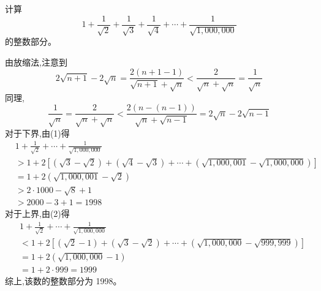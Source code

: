\begin{questions}
    \question 计算 
    \[
    1 + \frac{1}{\sqrt{2}} + \frac{1}{\sqrt{3}} + \frac{1}{\sqrt{4}} + \cdots + \frac{1}{\sqrt{1,000,000}}
    \]
    的整数部分。
    \begin{solution}
        由放缩法,注意到
        \[ 
        2\sqrt{n+1} - 2\sqrt{n} = \frac{2(n+1-1)}{\sqrt{n+1} + \sqrt{n}} < \frac{2}{\sqrt{n} + \sqrt{n}} = \frac{1}{\sqrt{n}} \tag{1}
        \]
        同理,
        \[
        \frac{1}{\sqrt{n}} = \frac{2}{\sqrt{n} + \sqrt{n}} < \frac{2(n-(n-1))}{\sqrt{n} + \sqrt{n-1}} = 2\sqrt{n} - 2\sqrt{n-1} \tag{2}
        \]
        对于下界,由(1)得
        \begin{align*}
        &1 + \frac{1}{\sqrt{2}} + \cdots + \frac{1}{\sqrt{1,000,000}} \\
        &> 1 + 2 \left[(\sqrt{3} - \sqrt{2}) + (\sqrt{4} - \sqrt{3}) + \cdots + (\sqrt{1,000,001} - \sqrt{1,000,000})\right] \\
        &= 1 + 2(\sqrt{1,000,001} - \sqrt{2}) \\
        &> 2 \cdot 1000 - \sqrt{8} + 1 \\
        &> 2000 - 3 + 1 = 1998
        \end{align*}
        对于上界,由(2)得
        \begin{align*}
        &1 + \frac{1}{\sqrt{2}} + \cdots + \frac{1}{\sqrt{1,000,000}} \\
        &< 1 + 2 \left[(\sqrt{2} - 1) + (\sqrt{3} - \sqrt{2}) + \cdots + (\sqrt{1,000,000} - \sqrt{999,999})\right] \\
        &= 1 + 2(\sqrt{1,000,000} - 1) \\
        &= 1 + 2 \cdot 999 = 1999
        \end{align*}
        综上,该数的整数部分为 1998。
    \end{solution}


\end{questions}
